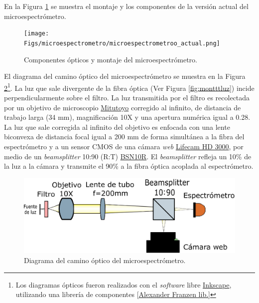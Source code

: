 \hspace{0.5cm}En la Figura \ref{fig:micromfinal} se muestra el montaje y los componentes de la versión actual del microespectrómetro. 
\begin{figure}[H]
	\centering
	\texttt{[image: Figs/microespectrometro/microespectrometroo\_actual.png]}
	\caption{Componentes ópticos y montaje del microespectrómetro.}
	\label{fig:micromfinal}
\end{figure}
El diagrama del camino óptico del microespectrómetro se muestra en la Figura \ref{fig:diagcaminoopt}\footnote{Los diagramas ópticos fueron realizados con el \textit{software} libre \href{https://inkscape.org/es/}{Inkscape}, utilizando una librería de componentes [\href{http://www.gwoptics.org/ComponentLibrary/}{Alexander Franzen lib.]}}. La luz que sale divergente de la fibra óptica (Ver Figura \ref{fig:montttluz}) incide perpendicularmente sobre el filtro. La luz transmitida por el filtro es recolectada por un objetivo de microscopio \href{https://www.edmundoptics.com/p/10x-mitutoyo-plan-apo-infinity-corrected-long-wd-objective/6623/}{Mitutoyo} corregido al infinito, de distancia de trabajo larga (34 mm), magnificación 10X y una apertura numérica igual a 0.28. La luz que sale corregida al infinito del objetivo es enfocada con una lente biconvexa de distancia focal igual a 200 mm de forma simultánea a la fibra del espectrómetro y a un sensor CMOS de una cámara \textit{web} \href{https://www.microsoft.com/accessories/es-xl/d/lifecam-hd-3000}{Lifecam HD 3000}, por medio de un \textit{beamsplitter} 10:90 (R:T) \href{https://www.thorlabs.com/thorproduct.cfm?partnumber=BSN10R}{BSN10R}. El \textit{beamsplitter} refleja un 10\% de la luz a la cámara y transmite el 90\% a la fibra óptica acoplada al espectrómetro. 
\begin{figure}[H]
	\centering
	\includegraphics[width=1.0\textwidth]{Figs/microespectrometro/diagopticosetup.png}
	\caption{Diagrama del camino óptico del microespectrómetro.}
	\label{fig:diagcaminoopt}
\end{figure}

